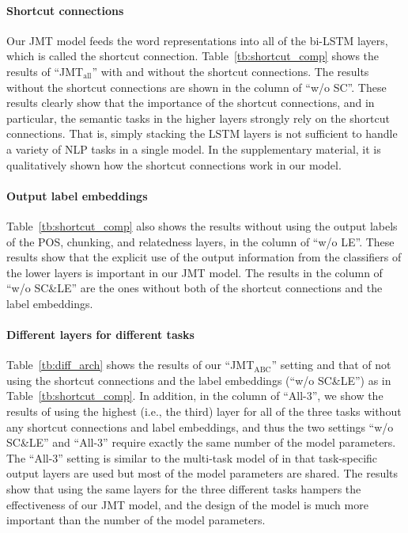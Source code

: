 \documentclass[11pt,a4paper]{article}
\begin{document}
\paragraph{Shortcut connections}
Our JMT model feeds the word representations into all of the bi-LSTM layers, which is called the shortcut connection.
Table~\ref{tb:shortcut_comp} shows the results of ``JMT$_{\mathrm{all}}$'' with and without the shortcut connections.
The results without the shortcut connections are shown in the column of ``w/o SC''.
These results clearly show that the importance of the shortcut connections, and in particular, the semantic tasks in the higher layers strongly rely on the shortcut connections.
That is, simply stacking the LSTM layers is not sufficient to handle a variety of NLP tasks in a single model.
In the supplementary material, it is qualitatively shown how the shortcut connections work in our model.

\paragraph{Output label embeddings}
Table~\ref{tb:shortcut_comp} also shows the results without using the output labels of the POS, chunking, and relatedness layers, in the column of ``w/o LE''.
These results show that the explicit use of the output information from the classifiers of the lower layers is important in our JMT model.
The results in the column of ``w/o SC\&LE'' are the ones without both of the shortcut connections and the label embeddings.


\paragraph{Different layers for different tasks}
Table~\ref{tb:diff_arch} shows the results of our ``JMT$_{\mathrm{ABC}}$'' setting and that of not using the shortcut connections and the label embeddings (``w/o SC\&LE'') as in Table~\ref{tb:shortcut_comp}.
In addition, in the column of ``All-3'', we show the results of using the highest (i.e., the third) layer for all of the three tasks without any shortcut connections and label embeddings, and thus the two settings ``w/o SC\&LE'' and ``All-3'' require exactly the same number of the model parameters.
The ``All-3'' setting is similar to the multi-task model of \citet{collobert2011senna} in that task-specific output layers are used but most of the model parameters are shared.
The results show that using the same layers for the three different tasks hampers the effectiveness of our JMT model, and the design of the model is much more important than the number of the model parameters.
\end{document}
